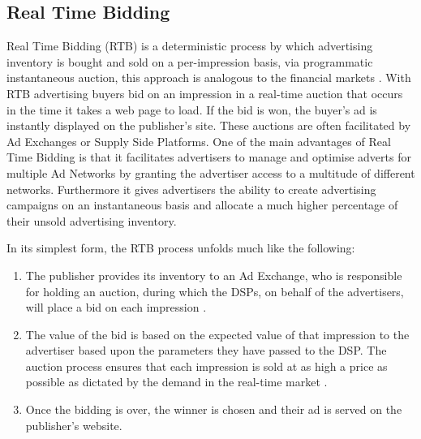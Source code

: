 \documentclass[12pt]{article}
\begin{document}
\subsection{Real Time Bidding}
Real Time Bidding (RTB) is a deterministic process by which advertising inventory is bought and sold on a per-impression basis, via programmatic instantaneous auction, this approach is analogous to the financial markets \parencite{RTB}. With RTB advertising buyers bid on an impression in a real-time auction that occurs in the time it takes a web page to load. If the bid is won, the buyer's ad is instantly displayed on the publisher's site. These auctions are often facilitated by Ad Exchanges or Supply Side Platforms. One of the main advantages of Real Time Bidding is that it facilitates advertisers to manage and optimise adverts for multiple Ad Networks by granting the advertiser access to a multitude of different networks. Furthermore it gives advertisers the ability to create advertising campaigns on an instantaneous basis and allocate a much higher percentage of their unsold advertising inventory. \newline

In its simplest form, the RTB process unfolds much like the following: 
\begin{enumerate}
\item The publisher provides its inventory to an Ad Exchange, who is responsible for holding an auction, during which the DSPs, on behalf of the advertisers, will place a bid on each impression \parencite{howRTBWorks}. 
\item The value of the bid is based on the expected value of that impression to the advertiser based upon the parameters they have passed to the DSP. The auction process ensures that each impression is sold at as high a price as possible as dictated by the demand in the real-time market \parencite{howRTBWorks}. 
\item Once the bidding is over, the winner is chosen and their ad is served on the publisher's website. 
\end{enumerate}
\end{document}
